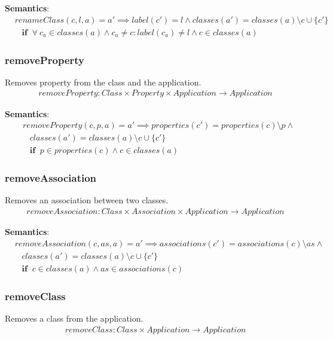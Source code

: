 \documentclass[10pt]{article}
\begin{document}
\noindent \textbf{Semantics}:
\begin{align}
& renameClass(c, l, a) = a' \implies label(c') = l \land classes(a') = classes(a) \setminus c  \cup \{c'\} \nonumber \\
& \;\;\; \mathbf{if} \;\; \forall \: c_a \in classes(a) \land c_a \neq c: label(c_a) \neq l  \land c \in classes(a)
\end{align}

\subsubsection{removeProperty}
Removes property from the class and the application.
\begin{align}
removeProperty: Class \times Property \times Application \rightarrow Application
\end{align}

\noindent \textbf{Semantics}:
\begin{align}
& removeProperty(c, p, a) = a' \implies properties(c') = properties(c) \setminus p   \land \nonumber \\
& \;\;\; classes(a') = classes(a) \setminus c  \cup \{c'\}  \nonumber \\
& \;\;\; \mathbf{if} \;\; p \in properties(c) \land c \in classes(a)
\end{align}

\subsubsection{removeAssociation}
Removes an association between two classes.
\begin{align}
removeAssociation: Class \times Association \times Application \rightarrow Application
\end{align}

\noindent \textbf{Semantics}:
\begin{align}
& removeAssociation(c, as, a) = a' \implies associations(c') = associations(c) \setminus as \land \nonumber \\
& \;\;\; classes(a') = classes(a) \setminus c  \cup \{c'\} \nonumber \\
& \;\;\; \mathbf{if} \;\; c \in classes(a) \land as \in associations(c)
\end{align}

\subsubsection{removeClass}
Removes a class from the application.
\begin{align}
removeClass: Class \times Application \rightarrow Application
\end{align}
\end{document}
